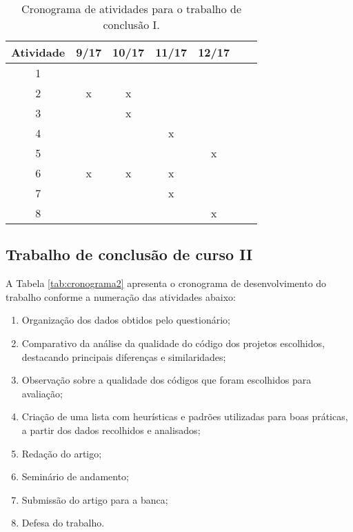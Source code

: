 \documentclass[11pt,a4paper]{article}
\begin{document}
\begin{table}[h]
\begin{center}
	\caption{Cronograma de atividades para o trabalho de conclusão I. \label{tab:cronograma1}}
		\begin{tabular}{|c|c|c|c|c|c|c|}
			\hline			
			 \bf Atividade & \bf 9/17 & \bf 10/17 & \bf 11/17 & \bf 12/17  \\	\hline \hline
					 1 &   &   &   &   \\ \hline
					 2 & x & x &   &   \\ \hline
					 3 &   & x &   &   \\ \hline
					 4 &   &   & x &   \\ \hline
					 5 &   &   &   & x \\ \hline
					 6 & x & x & x &   \\ \hline
					 7 &   &   & x &   \\ \hline
					 8 &   &   &   & x \\ \hline
		\end{tabular}
\end{center}		
\end{table}


\subsection{Trabalho de conclusão de curso II}

A Tabela \ref{tab:cronograma2} apresenta o cronograma de desenvolvimento do trabalho conforme a numeração das atividades abaixo:
\begin{enumerate}
    \item Organização dos dados obtidos pelo questionário;
    \item Comparativo da análise da qualidade do código dos projetos escolhidos, destacando principais diferenças e similaridades;
	\item Observação sobre a qualidade dos códigos que foram escolhidos para avaliação;
	\item Criação de uma lista com heurísticas e padrões utilizadas para boas práticas, a partir dos dados recolhidos e analisados;
	\item Redação do artigo;	
	\item Seminário de andamento;	
	\item Submissão do artigo para a banca;
	\item Defesa do trabalho.
\end{enumerate}
\end{document}
